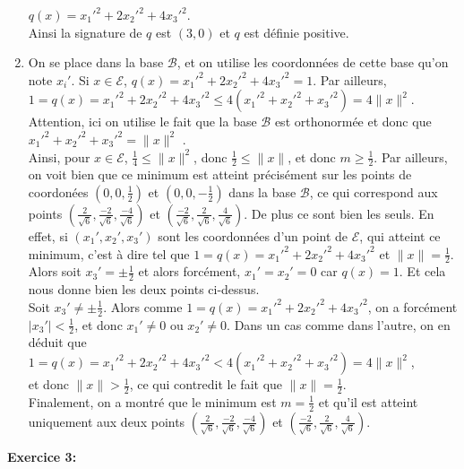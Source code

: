 \documentclass[a4paper, 10pt]{article}
\theoremstyle{plain}
\begin{document}
\begin{enumerate}
$q(x) = x_1'^2 + 2x_2'^2 + 4x_3'^2$. \\
Ainsi la signature de $q$ est $(3,0)$ et $q$ est définie positive.
\item 
On se place dans la base $\mathcal{B}$, et on utilise les coordonnées de cette base qu'on note 
$x_i'$. Si $x\in \mathcal{E}$, 
$q(x) = x_1'^2 + 2x_2'^2 + 4x_3'^2 = 1$. 
Par ailleurs,\\
$1=q(x) = x_1'^2 + 2x_2'^2 + 4x_3'^2 \leq 4( x_1'^2 + x_2'^2 + x_3'^2) = 4\|x\|^2$.\\
Attention, ici on utilise le fait que la base $\mathcal{B}$ est orthonormée et donc que 
$ x_1'^2 + x_2'^2 + x_3'^2 = \|x\|^2$ .\\ 
Ainsi, pour 
$x\in \mathcal{E}$, 
$\frac{1}{4} \leq \|x\|^2$, donc 
$\frac{1}{2} \leq \|x\|$, 
et donc 
$m\geq \frac{1}{2}$.
Par ailleurs, on voit bien que ce minimum est atteint précisément sur 
les points de coordonées $(0,0,\frac{1}{2})$ et $(0,0,-\frac{1}{2})$ dans la base $\mathcal{B}$, ce qui correspond aux points 
$(\frac{2}{\sqrt{6}}, \frac{-2}{\sqrt{6}} , \frac{-4}{\sqrt{6}} )$ et 
$(\frac{-2}{\sqrt{6}}, \frac{2}{\sqrt{6}} , \frac{4}{\sqrt{6}} )$. De plus ce sont bien les seuls. 
En effet, si 
$(x_1' , x_2',x_3')$ sont les coordonnées d'un point de $\mathcal{E}$, qui atteint ce minimum, c'est à dire tel que  
$1=q(x) = x_1'^2 + 2x_2'^2 + 4x_3'^2$ et $\|x\| = \frac{1}{2}$. \\ 
Alors soit 
$x_3' = \pm \frac{1}{2}$ et alors forcément, 
$x_1'=x_2'=0$ car $q(x)=1$. Et cela nous donne bien les deux points ci-dessus. \\
Soit $x_3' \neq \pm \frac{1}{2}$. Alors comme 
$1=q(x) = x_1'^2 + 2x_2'^2 + 4x_3'^2$, on a forcément 
$|x_3'| < \frac{1}{2}$, et donc $x_1' \neq 0$ ou $x_2' \neq 0$. Dans un 
cas comme dans l'autre, on en déduit que \\
$1=q(x) = x_1'^2 + 2x_2'^2 + 4x_3'^2 < 4(x_1'^2 + x_2'^2 + x_3'^2 ) = 4\|x\|^2$, \\
et donc 
$\|x\| > \frac{1}{2}$, ce qui contredit le fait que 
$\|x\| = \frac{1}{2}$. \vspace{8pt}\\
Finalement, on a montré que le minimum est $m=\frac{1}{2}$ et qu'il est 
atteint uniquement aux deux points $(\frac{2}{\sqrt{6}}, \frac{-2}{\sqrt{6}} , \frac{-4}{\sqrt{6}} )$ et 
$(\frac{-2}{\sqrt{6}}, \frac{2}{\sqrt{6}} , \frac{4}{\sqrt{6}} )$.

\end{enumerate}
\medskip
\noindent
\textbf{Exercice 3:}\\
\end{document}
